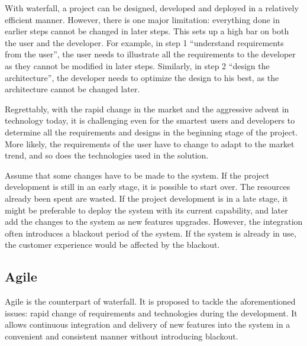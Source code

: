 With waterfall, a project can be designed, developed and deployed in a relatively efficient manner. However, there is one major limitation: everything done in earlier steps cannot be changed in later steps. This sets up a high bar on both the user and the developer. For example, in step 1 ``understand requirements from the user'', the user needs to illustrate all the requirements to the developer as they cannot be modified in later steps. Similarly, in step 2 ``design the architecture'', the developer needs to optimize the design to his best, as the architecture cannot be changed later.

Regrettably, with the rapid change in the market and the aggressive advent in technology today, it is challenging even for the smartest users and developers to determine all the requirements and designs in the beginning stage of the project. More likely, the requirements of the user have to change to adapt to the market trend, and so does the technologies used in the solution.

Assume that some changes have to be made to the system. If the project development is still in an early stage, it is possible to start over. The resources already been spent are wasted. If the project development is in a late stage, it might be preferable to deploy the system with its current capability, and later add the changes to the system as new features upgrades. However, the integration often introduces a blackout period of the system. If the system is already in use, the customer experience would be affected by the blackout.

\subsection{Agile}

Agile is the counterpart of waterfall. It is proposed to tackle the aforementioned issues: rapid change of requirements and technologies during the development. It allows continuous integration and delivery of new features into the system in a convenient and consistent manner without introducing blackout.

